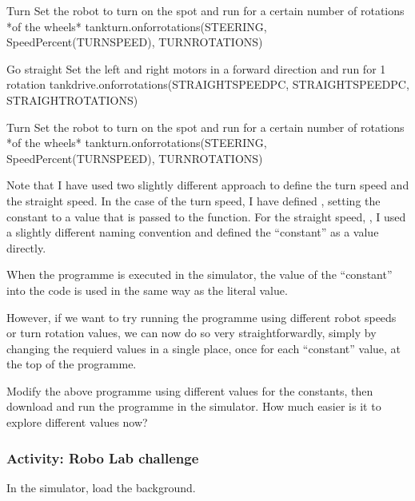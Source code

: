 \documentclass[letterpaper,10pt,english]{sphinxmanual}
\begin{document}
{{\begin{sphinxVerbatim}[commandchars=\\\{\}]
\PYGZsh{}Turn
\PYGZsh{} Set the robot to turn on the spot
\PYGZsh{} and run for a certain number of rotations *of the wheels*
tank\PYGZus{}turn.on\PYGZus{}for\PYGZus{}rotations(STEERING, SpeedPercent(TURN\PYGZus{}SPEED), TURN\PYGZus{}ROTATIONS)

\PYGZsh{}Go straight
\PYGZsh{} Set the left and right motors in a forward direction
\PYGZsh{} and run for 1 rotation
tank\PYGZus{}drive.on\PYGZus{}for\PYGZus{}rotations(STRAIGHT\PYGZus{}SPEED\PYGZus{}PC, STRAIGHT\PYGZus{}SPEED\PYGZus{}PC, STRAIGHT\PYGZus{}ROTATIONS)

\PYGZsh{}Turn
\PYGZsh{} Set the robot to turn on the spot
\PYGZsh{} and run for a certain number of rotations *of the wheels*
tank\PYGZus{}turn.on\PYGZus{}for\PYGZus{}rotations(STEERING, SpeedPercent(TURN\PYGZus{}SPEED), TURN\PYGZus{}ROTATIONS)
\end{sphinxVerbatim}
}

Note that I have used two slightly different approach to define the turn speed and the straight speed. In the case of the turn speed, I have defined , setting the constant to a value that is passed to the  function. For the straight speed, , I used a slightly different naming convention and defined the “constant” as a  value directly.

When the programme is executed in the simulator, the value of the “constant” into the code is used in the same way as the literal value.

However, if we want to try running the programme using different robot speeds or turn rotation values, we can now do so very straightforwardly, simply by changing the requierd values in a single place, once for each “constant” value, at the top of the programme.

Modify the above programme using different values for the constants, then download and run the programme in the simulator. How much easier is it to explore different values now?


\subsubsection{Activity: Robo Lab challenge}
\label{\detokenize{content/01_Robot_Lab/Section_00_02:Activity:-Robo-Lab-challenge}}
In the simulator, load the  background.

}
\end{document}
